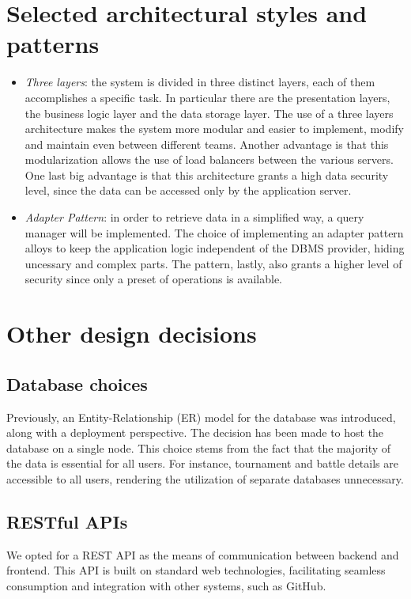 \documentclass[12pt, a4paper]{report}
\begin{document}
    \section{Selected architectural styles and patterns}
    \begin{itemize}
        \item \textit{Three layers}: the system is divided in three distinct layers, each of them accomplishes a specific task.
            In particular there are the presentation layers, the business logic layer and the data storage layer.
            The use of a three layers architecture makes the system more modular and easier to implement, modify and maintain even between different teams.
            Another advantage is that this modularization allows the use of load balancers between the various servers.
            One last big advantage is that this architecture grants a high data security level, since the data can be accessed only by the application server.
        \item \textit{Adapter Pattern}: in order to retrieve data in a simplified way, a query manager will be implemented.
            The choice of implementing an adapter pattern alloys to keep the application logic independent of the DBMS provider, hiding uncessary and complex parts. 
            The pattern, lastly, also grants a higher level of security since only a preset of operations is available. 
    \end{itemize}

    \section{Other design decisions}
        \subsection{Database choices}
        Previously, an Entity-Relationship (ER) model for the database was introduced, along with a deployment perspective.
        The decision has been made to host the database on a single node.
        This choice stems from the fact that the majority of the data is essential for all users.
        For instance, tournament and battle details are accessible to all users, rendering the utilization of separate databases unnecessary.
        
        \subsection{RESTful APIs}
        We opted for a REST API as the means of communication between backend and frontend.
        This API is built on standard web technologies, facilitating seamless consumption and integration with other systems, such as GitHub.
\end{document}

